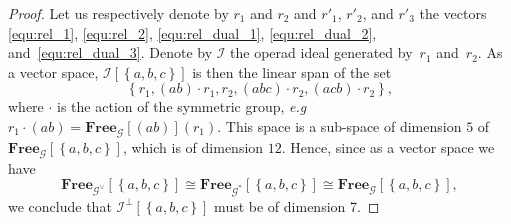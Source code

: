 \documentclass[11pt]{article}
\theoremstyle{definition}
\numberwithin{equation}{section}
\newcommand{\set}[1]{\left\{#1\right\}}
\newcommand{\op}[1]{\mathbf{#1}}
\newcommand{\free}[1]{\op{Free}_{#1}}
\begin{document}
\begin{proof}
    Let us respectively denote by $r_1$ and $r_2$ and $r'_1$, $r'_2$, and $r'_3$ the vectors \eqref{equ:rel_1}, 
    \eqref{equ:rel_2}, \eqref{equ:rel_dual_1}, \eqref{equ:rel_dual_2}, and~\eqref{equ:rel_dual_3}. Denote by 
    $\mathcal{I}$ the operad ideal generated by~$r_1$ and~$r_2$. As a vector space, 
    $\mathcal{I}[\set{a,b,c}]$ is then the linear span of the set
    \begin{equation}
        \set{r_1, (ab)\cdot r_1, r_2, (abc) \cdot r_2, (acb) \cdot r_2},
    \end{equation}
    where $\cdot$ is the action of the symmetric group, \textit{e.g} 
    $r_1\cdot (ab) = \free{\mathcal{G}}[(ab)](r_1)$. This space is a sub-space of dimension $5$ of 
    $\free{\mathcal{G}}[\set{a,b,c}]$, which is of dimension $12$. Hence, since as a vector space we have
    \begin{equation}
        \free{\mathcal{G}^\vee}[\set{a,b,c}]
        \cong \free{\mathcal{G}^*}[\set{a,b,c}]\cong
        \free{\mathcal{G}}[\set{a,b,c}],
    \end{equation}
    we conclude that $\mathcal{I}^{\bot}[\set{a,b,c}]$ must be of dimension 7.


\end{proof}
\end{document}
